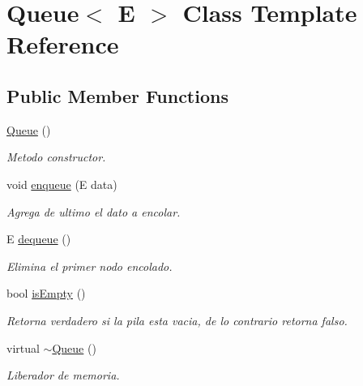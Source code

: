 \hypertarget{class_queue}{\section{Queue$<$ E $>$ Class Template Reference}
\label{class_queue}
}
\subsection*{Public Member Functions}
\begin{DoxyCompactItemize}
\item 
\hypertarget{class_queue_ab09891e54b51dc677ee6efb350687ae4}{\hyperlink{class_queue_ab09891e54b51dc677ee6efb350687ae4}{Queue} ()}\label{class_queue_ab09891e54b51dc677ee6efb350687ae4}

\begin{DoxyCompactList}\small\item\em Metodo constructor. \end{DoxyCompactList}\item 
void \hyperlink{class_queue_ad751a5ab9f313291a85455542b12a184}{enqueue} (E data)
\begin{DoxyCompactList}\small\item\em Agrega de ultimo el dato a encolar. \end{DoxyCompactList}\item 
E \hyperlink{class_queue_ac2b0f94e80e6df3002d284e38bdc117b}{dequeue} ()
\begin{DoxyCompactList}\small\item\em Elimina el primer nodo encolado. \end{DoxyCompactList}\item 
bool \hyperlink{class_queue_a4ea980b5773a6afbc3b2ed89bad8e7c9}{is\-Empty} ()
\begin{DoxyCompactList}\small\item\em Retorna verdadero si la pila esta vacia, de lo contrario retorna falso. \end{DoxyCompactList}\item 
\hypertarget{class_queue_a49fe82adb8dc2fb62ab53876a6933d0f}{virtual \hyperlink{class_queue_a49fe82adb8dc2fb62ab53876a6933d0f}{$\sim$\-Queue} ()}\label{class_queue_a49fe82adb8dc2fb62ab53876a6933d0f}

\begin{DoxyCompactList}\small\item\em Liberador de memoria. \end{DoxyCompactList}\end{DoxyCompactItemize}


